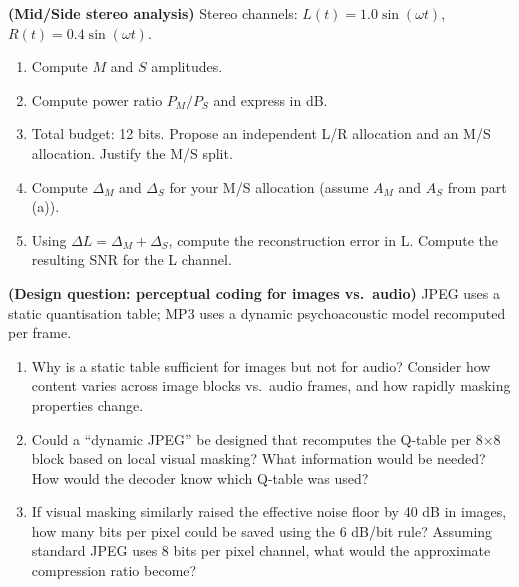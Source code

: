 \begin{exercisebox}
\textbf{(Mid/Side stereo analysis)}
Stereo channels: $L(t) = 1.0\sin(\omega t)$, $R(t) = 0.4\sin(\omega t)$.
\begin{enumerate}[nosep, label=(\alph*)]
  \item Compute $M$ and $S$ amplitudes.
  \item Compute power ratio $P_M / P_S$ and express in dB.
  \item Total budget: 12 bits. Propose an independent L/R allocation and an M/S allocation. Justify the M/S split.
  \item Compute $\Delta_M$ and $\Delta_S$ for your M/S allocation (assume $A_M$ and $A_S$ from part (a)).
  \item Using $\Delta L = \Delta_M + \Delta_S$, compute the reconstruction error in L. Compute the resulting SNR for the L channel.
\end{enumerate}
\end{exercisebox}

\begin{exercisebox}
\textbf{(Design question: perceptual coding for images vs.\ audio)}
JPEG uses a static quantisation table; MP3 uses a dynamic psychoacoustic model recomputed per frame.
\begin{enumerate}[nosep, label=(\alph*)]
  \item Why is a static table sufficient for images but not for audio? Consider how content varies across image blocks vs.\ audio frames, and how rapidly masking properties change.
  \item Could a ``dynamic JPEG'' be designed that recomputes the Q-table per 8$\times$8 block based on local visual masking? What information would be needed? How would the decoder know which Q-table was used?
  \item If visual masking similarly raised the effective noise floor by 40 dB in images, how many bits per pixel could be saved using the 6 dB/bit rule? Assuming standard JPEG uses 8 bits per pixel channel, what would the approximate compression ratio become?
\end{enumerate}
\end{exercisebox}
